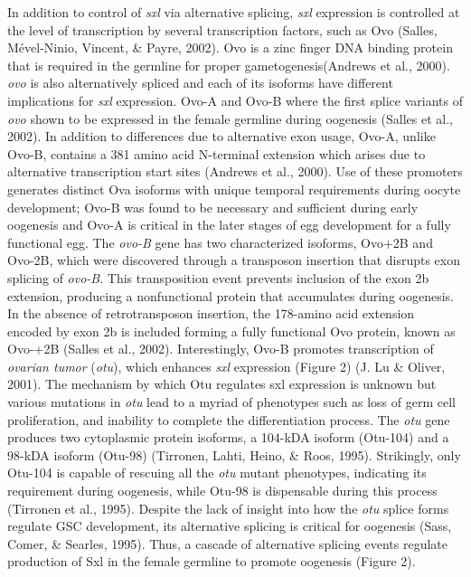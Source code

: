 \documentclass[12pt,oneside]{reedthesis}
\begin{document}
In addition to control of \emph{sxl} via alternative splicing, \emph{sxl}
expression is controlled at the level of transcription by several
transcription factors, such as Ovo (Salles, Mével-Ninio, Vincent, \& Payre, 2002). Ovo is a zinc
finger DNA binding protein that is required in the germline for proper
gametogenesis(Andrews et al., 2000). \emph{ovo} is also alternatively spliced and
each of its isoforms have different implications for \emph{sxl} expression.
Ovo-A and Ovo-B where the first splice variants of \emph{ovo} shown to be
expressed in the female germline during oogenesis (Salles et al., 2002). In
addition to differences due to alternative exon usage, Ovo-A, unlike
Ovo-B, contains a 381 amino acid N-terminal extension which arises due
to alternative transcription start sites (Andrews et al., 2000). Use of
these promoters generates distinct Ova isoforms with unique temporal
requirements during oocyte development; Ovo-B was found to be necessary
and sufficient during early oogenesis and Ovo-A is critical in the later
stages of egg development for a fully functional egg. The \emph{ovo-B} gene
has two characterized isoforms, Ovo+2B and Ovo-2B, which were discovered
through a transposon insertion that disrupts exon splicing of \emph{ovo-B}.
This transposition event prevents inclusion of the exon 2b extension,
producing a nonfunctional protein that accumulates during oogenesis. In
the absence of retrotransposon insertion, the 178-amino acid extension
encoded by exon 2b is included forming a fully functional Ovo protein,
known as Ovo-+2B (Salles et al., 2002). Interestingly, Ovo-B promotes
transcription of \emph{ovarian tumor} (\emph{otu}), which enhances \emph{sxl}
expression (Figure 2) (J. Lu \& Oliver, 2001). The mechanism by which Otu regulates
sxl expression is unknown but various mutations in \emph{otu} lead to a
myriad of phenotypes such as loss of germ cell proliferation, and
inability to complete the differentiation process. The \emph{otu} gene
produces two cytoplasmic protein isoforms, a 104-kDA isoform (Otu-104)
and a 98-kDA isoform (Otu-98) (Tirronen, Lahti, Heino, \& Roos, 1995). Strikingly, only
Otu-104 is capable of rescuing all the \emph{otu} mutant phenotypes,
indicating its requirement during oogenesis, while Otu-98 is dispensable
during this process (Tirronen et al., 1995). Despite the lack of insight into
how the \emph{otu} splice forms regulate GSC development, its alternative
splicing is critical for oogenesis (Sass, Comer, \& Searles, 1995). Thus, a cascade of
alternative splicing events regulate production of Sxl in the female
germline to promote oogenesis (Figure 2).
\end{document}
